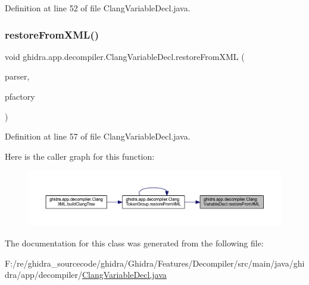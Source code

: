 Definition at line 52 of file Clang\+Variable\+Decl.\+java.

\mbox{\label{classghidra_1_1app_1_1decompiler_1_1_clang_variable_decl_a1da13d977c2e37bd4257752bb9819c96}} 
\subsubsection{\texorpdfstring{restoreFromXML()}{restoreFromXML()}}
{\footnotesize\ttfamily void ghidra.\+app.\+decompiler.\+Clang\+Variable\+Decl.\+restore\+From\+X\+ML (\begin{DoxyParamCaption}\item[{Xml\+Pull\+Parser}]{parser,  }\item[{Pcode\+Factory}]{pfactory }\end{DoxyParamCaption})\hspace{0.3cm}{\ttfamily [inline]}}



Definition at line 57 of file Clang\+Variable\+Decl.\+java.

Here is the caller graph for this function\+:
\nopagebreak
\begin{figure}[H]
\begin{center}
\leavevmode
\includegraphics[width=350pt]{classghidra_1_1app_1_1decompiler_1_1_clang_variable_decl_a1da13d977c2e37bd4257752bb9819c96_icgraph}
\end{center}
\end{figure}


The documentation for this class was generated from the following file\+:\begin{DoxyCompactItemize}
\item 
F\+:/re/ghidra\+\_\+sourcecode/ghidra/\+Ghidra/\+Features/\+Decompiler/src/main/java/ghidra/app/decompiler/\mbox{\hyperlink{_clang_variable_decl_8java}{Clang\+Variable\+Decl.\+java}}\end{DoxyCompactItemize}
